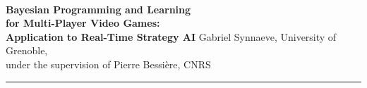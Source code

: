 \documentclass[a4paper,12pt]{article}
\date{}
\begin{document}
\begin{flushright}
\quad
\vskip 4pt
{\fontsize{16pt}{16} \selectfont \textbf{\\
Bayesian Programming and Learning\\
for Multi-Player Video Games: \\
Application to Real-Time Strategy AI}}
\vskip 10pt
Gabriel Synnaeve, University of Grenoble, \\
under the supervision of Pierre Bessi\`{e}re, CNRS
\vskip 10pt
\hrule height 4pt
\vskip 4pt
\end{flushright}

\thispagestyle{empty}


\end{document}
